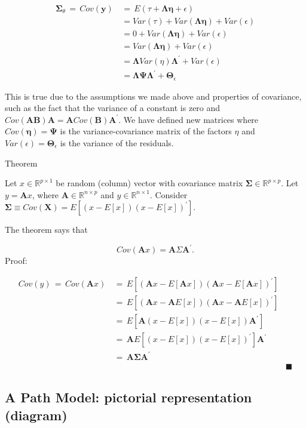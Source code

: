 \documentclass[
]{article}
\begin{document}
\[
\begin{align}
\mathbf{\Sigma}_{\theta} \, = \, Cov(\mathbf{y})\, & = \,E(\tau+\mathbf{\Lambda\eta}+\epsilon)\\
& =Var(\tau)+Var(\mathbf{\Lambda\eta})+Var(\epsilon)\\
& =0+Var(\mathbf{\Lambda\eta})+Var(\epsilon)\\
& =Var(\mathbf{\Lambda\eta})+Var(\epsilon)\\
& =\mathbf{\Lambda}Var(\eta)\mathbf{\Lambda}^{\prime}+Var(\epsilon)\\
& =\mathbf{\Lambda\Psi}\mathbf{\Lambda}^{\prime}+\mathbf{\Theta}_{\epsilon}
\end{align}
\]

This is true due to the assumptions we made above and properties of
covariance, such as the fact that the variance of a constant is zero and
\(Cov(\mathbf{AB})\mathbf{A}=\mathbf{A}Cov(\mathbf{B})\mathbf{A}^{\prime}\).
We have defined new matrices where \(Cov(\mathbf{\eta})=\mathbf{\Psi}\)
is the variance-covariance matrix of the factors \(\eta\) and
\(Var(\epsilon)=\mathbf{\Theta}_{\epsilon}\) is the variance of the
residuals.

Theorem

Let \(x \in \mathbb{R}^{p \times 1}\) be random (column) vector with
covariance matrix \(\mathbf{\Sigma} \in \mathbb{R}^{p \times p}\). Let
\(y = \mathbf{A}x\), where \(\mathbf{A} \in \mathbb{R}^{n \times p}\)
and \(y \in \mathbb{R}^{n \times 1}\). Consider
\(\mathbf{\Sigma} \equiv Cov(\mathbf{X})=E[(x-E[x])(x-E[x])^{\prime}]\).

The theorem says that

\[
  Cov(\mathbf{A}x)=\mathbf{A}\Sigma\mathbf{A}^{\prime}.
  \] Proof:

\[
\begin{align}
Cov(y) \, = \, Cov(\mathbf{A}x)\, & = \,E[(\mathbf{A}x-E[\mathbf{A}x])(\mathbf{A}x-E[\mathbf{A}x])^{\prime}]\\
& =\,E[(\mathbf{A}x-\mathbf{A}E[x])(\mathbf{A}x-\mathbf{A}E[x])^{\prime}]\\
& =\,E[\mathbf{A}(x-E[x])(x-E[x])\mathbf{A}^{\prime}]\\
& =\,\mathbf{A}E[(x-E[x])(x-E[x])^{\prime}]\mathbf{A}^{\prime}\\
& =\,\mathbf{A}\mathbf{\Sigma}\mathbf{A}^{\prime}\\
& & \blacksquare
\end{align}
\]

\hypertarget{a-path-model-pictorial-representation-diagram}{%
\subsection{A Path Model: pictorial representation
(diagram)}\label{a-path-model-pictorial-representation-diagram}}
\end{document}

